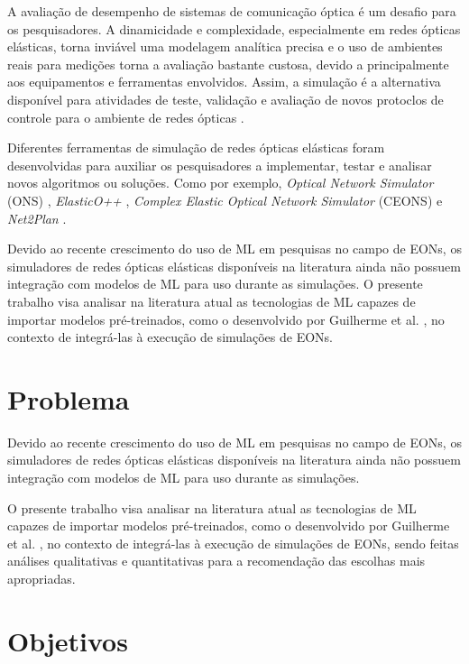 A avaliação de desempenho de sistemas de comunicação óptica é um desafio para os pesquisadores. A dinamicidade e complexidade, especialmente em redes ópticas elásticas, torna inviável uma modelagem analítica precisa e o uso de ambientes reais para medições torna a avaliação bastante custosa, devido a principalmente aos equipamentos e ferramentas envolvidos. Assim, a simulação é a alternativa disponível para atividades de teste, validação e avaliação de novos protoclos de controle para o ambiente de redes ópticas \cite{costa2016ons}.

Diferentes ferramentas de simulação de redes ópticas elásticas foram desenvolvidas para auxiliar os pesquisadores a implementar, testar e analisar novos algoritmos ou soluções. Como por exemplo, \textit{Optical Network Simulator} (ONS) \cite{costa2016ons}, \textit{ElasticO++} \cite{TESSINARI201695}, \textit{Complex Elastic Optical Network Simulator} (CEONS) \cite{ceons2015} e \textit{Net2Plan} \cite{net2plan}.

Devido ao recente crescimento do uso de ML em pesquisas no campo de EONs, os simuladores de redes ópticas elásticas disponíveis na literatura ainda não possuem integração com modelos de ML para uso durante as simulações. O presente trabalho visa analisar na literatura atual as tecnologias de ML capazes de importar modelos pré-treinados, como o desenvolvido por Guilherme et al. \cite{eon_ml_classifier_2020}, no contexto de integrá-las à execução de simulações de EONs.

\section{Problema}
\label{intro-problem}

Devido ao recente crescimento do uso de ML em pesquisas no campo de EONs, os simuladores de redes ópticas elásticas disponíveis na literatura ainda não possuem integração com modelos de ML para uso durante as simulações.

O presente trabalho visa analisar na literatura atual as tecnologias de ML capazes de importar modelos pré-treinados, como o desenvolvido por Guilherme et al. \cite{eon_ml_classifier_2020}, no contexto de integrá-las à execução de simulações de EONs, sendo feitas análises qualitativas e quantitativas para a recomendação das escolhas mais apropriadas.

\section{Objetivos}
\label{intro-goals}

